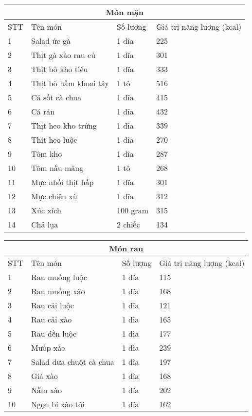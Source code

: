 \begin{center}
\begin{tabular}{ | m{1cm} | m{4cm}| m{3cm} | m{4cm}|}
 \hline
 \multicolumn{4}{|c|}{Món mặn} \\
 \hline
  STT& Tên món & Số lượng & Giá trị năng lượng (kcal) \\ 
\hline
  1 & Salad ức gà & 1 dĩa & 225 \\ 
 \hline
  2 & Thịt gà xào rau củ & 1 dĩa & 301 \\ 
 \hline
   3& Thịt bò kho tiêu & 1 dĩa & 333 \\ 
 \hline
   4 & Thịt bò hầm khoai tây & 1 tô & 516 \\ 
 \hline
   5 & Cá sốt cà chua & 1 dĩa & 415 \\ 
 \hline
   6 & Cá rán & 1 dĩa & 432 \\ 
 \hline
   7 & Thịt heo kho trứng & 1 dĩa & 339 \\ 
 \hline
    8 & Thịt heo luộc & 1 dĩa & 270 \\ 
 \hline
    9 & Tôm kho & 1 dĩa & 287 \\ 
 \hline
    10 & Tôm nấu măng & 1 tô & 268 \\ 
 \hline
    11 & Mực nhồi thịt hấp & 1 dĩa & 301 \\ 
 \hline
    12 & Mực chiên xù & 1 dĩa & 312 \\ 
 \hline
    13 & Xúc xích & 100 gram & 315 \\ 
 \hline
    14 & Chả lụa & 2 chiếc & 134 \\ 
 \hline
\end{tabular}
\end{center}



\begin{center}
\begin{tabular}{ | m{1cm} | m{4cm}| m{3cm} | m{4cm}|}
 \hline
 \multicolumn{4}{|c|}{Món rau} \\
 \hline
  STT& Tên món & Số lượng & Giá trị năng lượng (kcal) \\ 
\hline
  1 & Rau muống luộc & 1 dĩa & 115 \\ 
 \hline
  2 & Rau muống xào & 1 dĩa & 168\\ 
 \hline
   3& Rau cải luộc & 1 dĩa & 121 \\ 
 \hline
   4 & Rau cải xào & 1 dĩa & 165 \\ 
 \hline
   5 & Rau dền luộc & 1 dĩa & 177 \\ 
 \hline
   6 & Mướp xào & 1 dĩa & 239 \\ 
 \hline
   7 & Salad dưa chuột cà chua & 1 dĩa & 197 \\ 
 \hline
    8 & Giá xào & 1 dĩa & 168 \\ 
 \hline
    9 & Nấm xào & 1 dĩa & 202 \\ 
 \hline
    10 & Ngọn bí xào tỏi & 1 dĩa & 162 \\ 
 \hline
\end{tabular}
\end{center}



